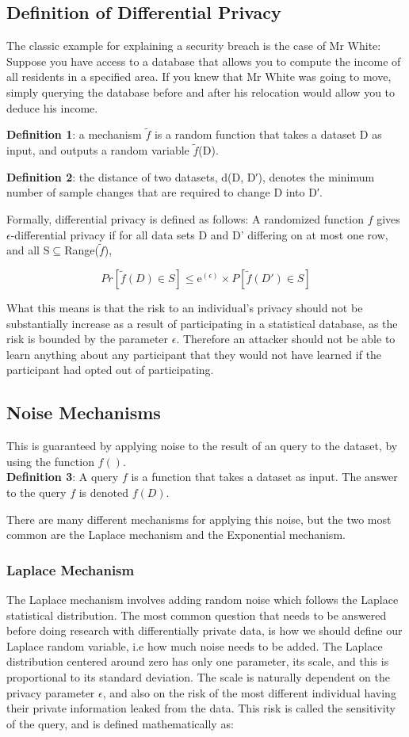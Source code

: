 \subsection{Definition of Differential Privacy}
The classic example for explaining a security breach is the case of Mr White: Suppose you have access to a database that allows you to compute the income of all residents in a specified area. If you knew that Mr White was going to move, simply querying the database before and after his relocation would allow you to deduce his income. 

\textbf{Definition 1}: a mechanism $\tilde{f}$ is a random function that takes a dataset D as input, and outputs a random variable $\tilde{f}$(D).

\textbf{Definition 2}: the distance of two datasets, d(D, D′), denotes the minimum number of sample changes that are required to change D into D′.

Formally, differential privacy is defined as follows:
A randomized function $f$ gives $\epsilon$-differential privacy if for all data sets D and D' differing on at most one row, and all S$\subseteq$Range($\tilde{f}$),

 $$Pr[\tilde{f}(D)\in S]\leq \mathrm{e}^{(\epsilon)}\times P[\tilde{f}(D')\in S]$$
 
What this means is that the risk to an individual's privacy should not be substantially increase as a result of participating in a statistical database, as the risk is bounded by the parameter $\epsilon$. Therefore an attacker should not be able to learn anything about any participant that they would not have learned if the participant had opted out of participating.


\subsection{Noise Mechanisms}
This is guaranteed by applying noise to the result of an query to the dataset, by using the function $f()$. \\
\textbf{Definition 3}: A query $f$ is a function that takes a dataset as input. The answer to the query $f$ is denoted $f(D)$.

There are many different mechanisms for applying this noise, but the two most common are the Laplace mechanism and the Exponential mechanism. 

\subsubsection{Laplace Mechanism}
The Laplace mechanism involves adding random noise which follows the Laplace statistical distribution. The most common question that needs to be answered before doing research with differentially private data, is how we should define our Laplace random variable, i.e how much noise needs to be added. The Laplace distribution centered around zero has only one parameter, its scale, and this is proportional to its standard deviation. The scale is naturally dependent on the privacy parameter $\epsilon$, and also on the risk of the most different individual having their private information leaked from the data. This risk is called the sensitivity of the query, and is defined mathematically as:

